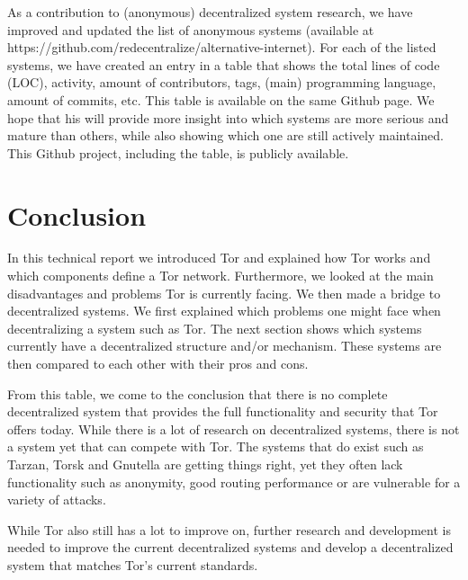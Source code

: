 \documentclass{article}
\begin{document}
	As a contribution to (anonymous) decentralized system research, we have improved and updated the list of anonymous systems (available at https://github.com/redecentralize/alternative-internet). For each of the listed systems, we have created an entry in a table that shows the total lines of code (LOC), activity, amount of contributors, tags, (main) programming language, amount of commits, etc. This table is available on the same Github page. We hope that his will provide more insight into which systems are more serious and mature than others, while also showing which one are still actively maintained. This Github project, including the table, is publicly available.

\section{Conclusion}
	\label{sec:conclusion}
		
	In this technical report we introduced Tor and explained how Tor works and which components define a Tor network. Furthermore, we looked at the main disadvantages and problems Tor is currently facing. We then made a bridge to decentralized systems. We first explained which problems one might face when decentralizing a system such as Tor. The next section shows which systems currently have a decentralized structure and/or mechanism. These systems are then compared to each other with their pros and cons.
		
	From this table, we come to the conclusion that there is no complete decentralized system that provides the full functionality and security that Tor offers today. While there is a lot of research on decentralized systems, there is not a system yet that can compete with Tor. The systems that do exist such as Tarzan, Torsk and Gnutella are getting things right, yet they often lack functionality such as anonymity, good routing performance or are vulnerable for a variety of attacks.
		
	While Tor also still has a lot to improve on, further research and development is needed to improve the current decentralized systems and develop a decentralized system that matches Tor's current standards.



\end{document}
